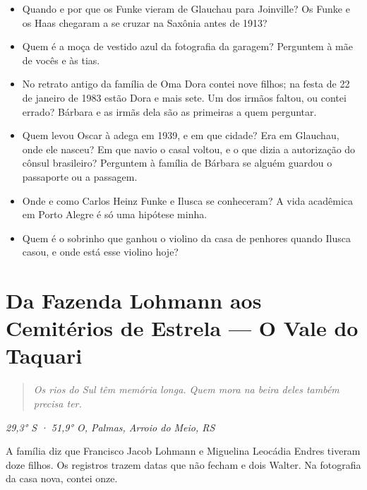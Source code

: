 \documentclass[
  brazilian,
  11pt,
  openany]{book}
\providecommand{\tightlist}{%
  \setlength{\itemsep}{0pt}\setlength{\parskip}{0pt}}
\begin{document}
\begin{itemize}
\tightlist
\item
  Quando e por que os Funke vieram de Glauchau para Joinville? Os Funke
  e os Haas chegaram a se cruzar na Saxônia antes de 1913?
\item
  Quem é a moça de vestido azul da fotografia da garagem? Perguntem à
  mãe de vocês e às tias.
\item
  No retrato antigo da família de Oma Dora contei nove filhos; na festa
  de 22 de janeiro de 1983 estão Dora e mais sete. Um dos irmãos faltou,
  ou contei errado? Bárbara e as irmãs dela são as primeiras a quem
  perguntar.
\item
  Quem levou Oscar à adega em 1939, e em que cidade? Era em Glauchau,
  onde ele nasceu? Em que navio o casal voltou, e o que dizia a
  autorização do cônsul brasileiro? Perguntem à família de Bárbara se
  alguém guardou o passaporte ou a passagem.
\item
  Onde e como Carlos Heinz Funke e Ilusca se conheceram? A vida
  acadêmica em Porto Alegre é só uma hipótese minha.
\item
  Quem é o sobrinho que ganhou o violino da casa de penhores quando
  Ilusca casou, e onde está esse violino hoje?
\end{itemize}

\chapter{Da Fazenda Lohmann aos Cemitérios de Estrela --- O Vale do
Taquari}\label{cap-12}

\begin{quote}
\emph{Os rios do Sul têm memória longa. Quem mora na beira deles também
precisa ter.}
\end{quote}

\emph{29,3° S · 51,9° O, Palmas, Arroio do Meio, RS}

A família diz que Francisco Jacob Lohmann e Miguelina Leocádia Endres
tiveram doze filhos. Os registros trazem datas que não fecham e dois
Walter. Na fotografia da casa nova, contei onze.
\end{document}
